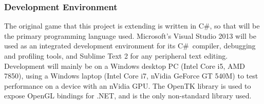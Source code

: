 \documentclass[12pt,a4paper]{article}
\newcommand{\Csh}{C{\lserif\#}}
\begin{document}
\subsubsection{Development Environment}\noindent
The original game that this project is extending is written in \Csh, so that will be the primary programming language used. Microsoft's Visual Studio 2013 will be used as an integrated development environment for its \Csh~compiler, debugging and profiling tools, and Sublime Text 2 for any peripheral text editing. Development will mainly be on a Windows desktop PC (Intel Core i5, AMD 7850), using a Windows laptop (Intel Core i7, nVidia GeForce GT 540M) to test performance on a device with an nVidia GPU. The OpenTK library is used to expose OpenGL bindings for .NET, and is the only non-standard library used.


\end{document}
